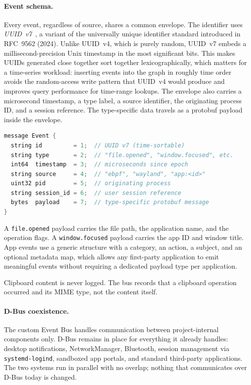 \paragraph{Event schema.}
Every event, regardless of source, shares a common envelope. The identifier
uses \emph{UUID~v7}~\cite{rfc9562}, a variant of the universally unique
identifier standard introduced in RFC~9562 (2024). Unlike UUID~v4, which is
purely random, UUID~v7 embeds a millisecond-precision Unix timestamp in the
most significant bits. This makes UUIDs generated close together sort together
lexicographically, which matters for a time-series workload: inserting events
into the graph in roughly time order avoids the random-access write pattern
that UUID~v4 would produce and improves query performance for time-range
lookups. The envelope also carries a microsecond timestamp, a type label, a
source identifier, the originating process ID, and a session reference. The
type-specific data travels as a protobuf payload inside the envelope.

\begin{lstlisting}[language=C, caption={Common event envelope (protobuf)}]
message Event {
  string id         = 1;  // UUID v7 (time-sortable)
  string type       = 2;  // "file.opened", "window.focused", etc.
  int64  timestamp  = 3;  // microseconds since epoch
  string source     = 4;  // "ebpf", "wayland", "app:<id>"
  uint32 pid        = 5;  // originating process
  string session_id = 6;  // user session reference
  bytes  payload    = 7;  // type-specific protobuf message
}
\end{lstlisting}

A \texttt{file.opened} payload carries the file path, the application name,
and the operation flags. A \texttt{window.focused} payload carries the app ID
and window title. App events use a generic structure with a category, an
action, a subject, and an optional metadata map, which allows any first-party
application to emit meaningful events without requiring a dedicated payload
type per application.

Clipboard content is never logged. The bus records that a clipboard operation
occurred and its MIME type, not the content itself.

\paragraph{D-Bus coexistence.}
The custom Event Bus handles communication between project-internal components
only. D-Bus remains in place for everything it already handles: desktop
notifications, NetworkManager, Bluetooth, session management via
\texttt{systemd-logind}, sandboxed app portals, and standard third-party
applications. The two systems run in parallel with no overlap; nothing that
communicates over D-Bus today is changed.

